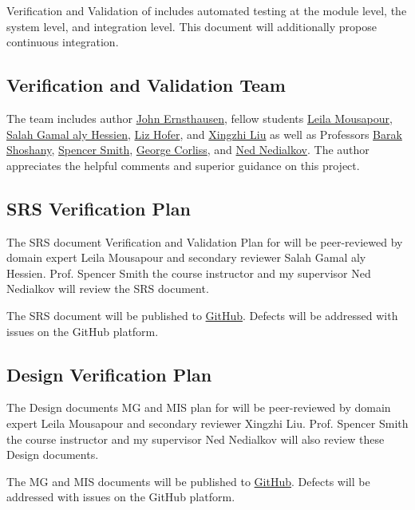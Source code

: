 \documentclass[12pt, titlepage]{article}
\begin{document}
Verification and Validation of  includes automated testing at the module level,
the system level, and integration level. This document will additionally propose continuous integration.

\subsection{Verification and Validation Team}

The  team includes
author
\href{https://github.com/JohnErnsthausen}{John Ernsthausen},
fellow students
\href{https://github.com/LeilaMousapour}{Leila Mousapour},
\href{https://github.com/salahhessien}{Salah Gamal aly Hessien},
\href{https://github.com/liziscool}{Liz Hofer},
and
\href{https://github.com/XingzhiMac}{Xingzhi Liu} as well as Professors
\href{http://baraksh.com}{Barak Shoshany},
\href{https://github.com/smiths}{Spencer Smith},
\href{https://www.cs.mu.edu/~george/}{George Corliss},
and
\href{http://www.cas.mcmaster.ca/~nedialk}{Ned Nedialkov}.
The author appreciates the helpful comments and superior guidance on this project.

\subsection{SRS Verification Plan}

The SRS document Verification and Validation Plan for  will be peer-reviewed by
domain expert Leila Mousapour and secondary reviewer Salah Gamal aly Hessien.
Prof. Spencer Smith the course instructor and my supervisor Ned Nedialkov will review the SRS
document.

The SRS document will be published to \href{https://github.com/JohnErnsthausen/roc}{GitHub}.
Defects will be addressed with issues on the GitHub platform.

\subsection{Design Verification Plan}

The Design documents MG and MIS plan for  will be peer-reviewed by
domain expert Leila Mousapour and secondary reviewer Xingzhi Liu.
Prof. Spencer Smith the course instructor and my supervisor Ned Nedialkov will also review these Design
documents.

The MG and MIS documents will be published to \href{https://github.com/JohnErnsthausen/roc}{GitHub}.
Defects will be addressed with issues on the GitHub platform.
\end{document}
